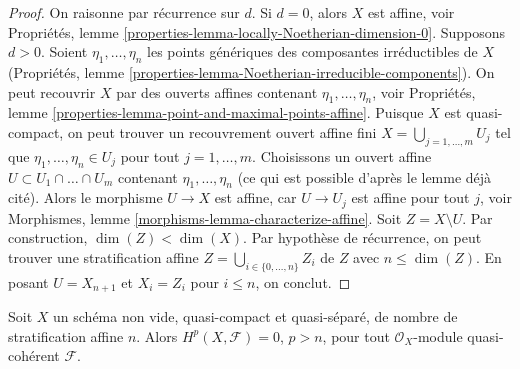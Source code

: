 \begin{proof}
On raisonne par récurrence sur $d$. Si $d = 0$, alors $X$ est affine, voir
Propriétés, lemme \ref{properties-lemma-locally-Noetherian-dimension-0}.
Supposons $d > 0$. Soient $\eta_1, \ldots, \eta_n$ les points génériques
des composantes irréductibles de $X$ (Propriétés, lemme
\ref{properties-lemma-Noetherian-irreducible-components}).
On peut recouvrir $X$ par des ouverts affines contenant $\eta_1, \ldots, \eta_n$, voir
Propriétés, lemme \ref{properties-lemma-point-and-maximal-points-affine}.
Puisque $X$ est quasi-compact, on peut trouver un recouvrement ouvert affine fini
$X = \bigcup_{j = 1, \ldots, m} U_j$ tel que
$\eta_1, \ldots, \eta_n \in U_j$ pour tout $j = 1, \ldots, m$.
Choisissons un ouvert affine $U \subset U_1 \cap \ldots \cap U_m$
contenant $\eta_1, \ldots, \eta_n$ (ce qui est possible d'après le lemme
déjà cité). Alors le morphisme $U \to X$ est affine,
car $U \to U_j$ est affine pour tout $j$, voir
Morphismes, lemme \ref{morphisms-lemma-characterize-affine}.
Soit $Z = X \setminus U$.
Par construction, $\dim(Z) < \dim(X)$.
Par hypothèse de récurrence, on peut trouver une
stratification affine $Z = \bigcup_{i \in \{0, \ldots, n\}} Z_i$
de $Z$ avec $n \leq \dim(Z)$.
En posant $U = X_{n + 1}$ et $X_i = Z_i$ pour $i \leq n$,
on conclut.
\end{proof}

\begin{proposition}
\label{proposition-vanishing-affine-stratification-number}
Soit $X$ un schéma non vide, quasi-compact et quasi-séparé, de
nombre de stratification affine $n$. Alors $H^p(X, \mathcal{F}) = 0$, $p > n$,
pour tout $\mathcal{O}_X$-module quasi-cohérent $\mathcal{F}$.
\end{proposition}

